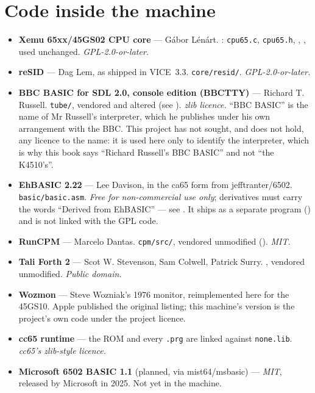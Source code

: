 \section{Code inside the machine}
\begin{itemize}[leftmargin=1.4em]
\item \textbf{Xemu 65xx/45GS02 CPU core} --- Gábor Lénárt.
  : \verb|cpu65.c|, \verb|cpu65.h|,
  , ,
  used unchanged. \emph{GPL-2.0-or-later.}
\item \textbf{reSID} --- Dag Lem, as shipped in VICE~3.3.
  \verb|core/resid/|. \emph{GPL-2.0-or-later.}
\item \textbf{BBC BASIC for SDL 2.0, console edition (BBCTTY)} ---
  Richard T. Russell. \verb|tube/|, vendored and altered (see
  ). \emph{zlib licence.} ``BBC BASIC'' is the
  name of Mr Russell's interpreter, which he publishes under his own
  arrangement with the BBC. This project has not sought, and does not
  hold, any licence to the name: it is used here only to identify the
  interpreter, which is why this book says ``Richard Russell's BBC
  BASIC'' and not ``the K4510's''.
\item \textbf{EhBASIC 2.22} --- Lee Davison, in the ca65 form from
  jefftranter/6502. \verb|basic/basic.asm|. \emph{Free for
  non-commercial use only}; derivatives must carry the words
  ``Derived from EhBASIC'' --- see .
  It ships as a separate program () and is not
  linked with the GPL code.
\item \textbf{RunCPM} --- Marcelo Dantas. \verb|cpm/src/|, vendored
  unmodified (). \emph{MIT.}
\item \textbf{Tali Forth 2} --- Scot W. Stevenson, Sam Colwell,
  Patrick Surry. , vendored unmodified.
  \emph{Public domain.}
\item \textbf{Wozmon} --- Steve Wozniak's 1976 monitor, reimplemented
  here for the 45GS10. Apple published the original listing; this
  machine's version is the project's own code under the project
  licence.
\item \textbf{cc65 runtime} --- the ROM and every \verb|.prg| are
  linked against \verb|none.lib|. \emph{cc65's zlib-style licence.}
\item \textbf{Microsoft 6502 BASIC 1.1} (planned, via mist64/msbasic)
  --- \emph{MIT}, released by Microsoft in 2025. Not yet in the
  machine.
\end{itemize}

